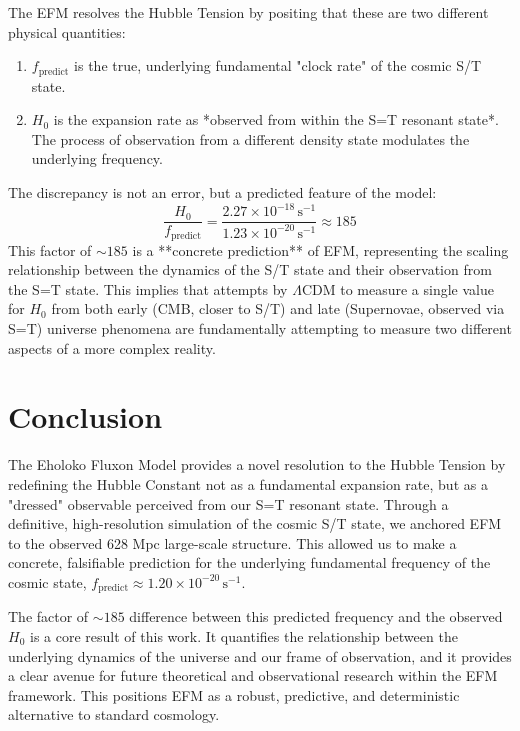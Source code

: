 \documentclass[11pt]{article}
\begin{document}
The EFM resolves the Hubble Tension by positing that these are two different physical quantities:
\begin{enumerate}
    \item \textbf{\(f_{\text{predict}}\)} is the true, underlying fundamental "clock rate" of the cosmic S/T state.
    \item \textbf{\(H_0\)} is the expansion rate as *observed from within the S=T resonant state*. The process of observation from a different density state modulates the underlying frequency.
\end{enumerate}

The discrepancy is not an error, but a predicted feature of the model:
\begin{equation}
\frac{H_0}{f_{\text{predict}}} = \frac{2.27 \times 10^{-18} \, \text{s}^{-1}}{1.23 \times 10^{-20} \, \text{s}^{-1}} \approx 185
\end{equation}
This factor of \(\sim 185\) is a **concrete prediction** of EFM, representing the scaling relationship between the dynamics of the S/T state and their observation from the S=T state. This implies that attempts by \(\Lambda\)CDM to measure a single value for \(H_0\) from both early (CMB, closer to S/T) and late (Supernovae, observed via S=T) universe phenomena are fundamentally attempting to measure two different aspects of a more complex reality.

\section{Conclusion}
The Eholoko Fluxon Model provides a novel resolution to the Hubble Tension by redefining the Hubble Constant not as a fundamental expansion rate, but as a "dressed" observable perceived from our S=T resonant state. Through a definitive, high-resolution simulation of the cosmic S/T state, we anchored EFM to the observed 628 Mpc large-scale structure. This allowed us to make a concrete, falsifiable prediction for the underlying fundamental frequency of the cosmic state, \(f_{\text{predict}} \approx 1.20 \times 10^{-20} \, \text{s}^{-1}\).

The factor of \(\sim 185\) difference between this predicted frequency and the observed \(H_0\) is a core result of this work. It quantifies the relationship between the underlying dynamics of the universe and our frame of observation, and it provides a clear avenue for future theoretical and observational research within the EFM framework. This positions EFM as a robust, predictive, and deterministic alternative to standard cosmology.
\end{document}
